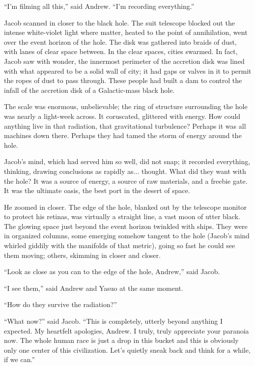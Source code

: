 \documentclass[english,11pt,letterpaper,onecolumn]{scrbook}
\begin{document}
	``I'm filming all this,'' said Andrew.  ``I'm recording everything.''

	Jacob scanned in closer to the black hole.  The suit telescope blocked out the intense white-violet light where matter, heated to the point of annihilation, went over the event horizon of the hole.  The disk was gathered into braids of dust, with lanes of clear space between.  In the clear spaces, cities swarmed.  In fact, Jacob saw with wonder, the innermost perimeter of the accretion disk was lined with what appeared to be a solid wall of city; it had gaps or valves in it to permit the ropes of dust to pass through.  These people had built a dam to control the infall of the accretion disk of a Galactic-mass black hole.  

	The scale was enormous, unbelievable; the ring of structure surrounding the hole was nearly a light-week across.  It coruscated, glittered with energy.  How could anything live in that radiation, that gravitational turbulence?  Perhaps it was all machines down there.  Perhaps they had tamed the storm of energy around the hole.

	Jacob's mind, which had served him so well, did not snap; it recorded everything, thinking, drawing conclusions as rapidly as... thought.  What did they want with the hole?  It was a source of energy, a source of raw materials, and a freebie gate.  It was the ultimate oasis, the best port in the desert of space.

	He zoomed in closer.  The edge of the hole, blanked out by the telescope monitor to protect his retinas, was virtually a straight line, a vast moon of utter black.  The glowing space just beyond the event horizon twinkled with ships.  They were in organized columns, some emerging somehow tangent to the hole (Jacob's mind whirled giddily with the manifolds of that metric), going so fast he could see them moving; others, skimming in closer and closer.

	``Look as close as you can to the edge of the hole, Andrew,'' said Jacob.

	``I see them,'' said Andrew and Yasuo at the same moment.

	``How do they survive the radiation?''

	``What now?'' said Jacob.  ``This is completely, utterly beyond anything I expected.  My heartfelt apologies, Andrew.  I truly, truly appreciate your paranoia now.  The whole human race is just a drop in this bucket and this is obviously only one center of this civilization.  Let's quietly sneak back and think for a while, if we can.''
\end{document}
